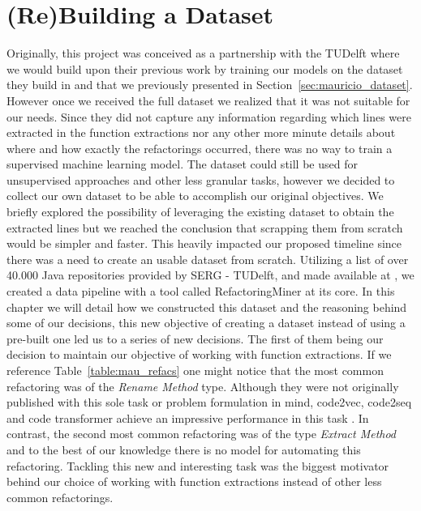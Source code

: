 



\chapter{(Re)Building a Dataset}
 Originally, this project was conceived as a partnership with the TUDelft where we would build upon their previous work by training our models on the dataset they build in \citet{mauricio_paper} and that we previously presented in Section~\ref{sec:mauricio_dataset}. However once we received the full dataset %
  we realized that it was not suitable for our needs. Since they did not capture any information regarding which lines were extracted in the function extractions nor any other more minute details about where and how  exactly the refactorings occurred, there was no way to train a supervised machine learning model. The dataset could still be used for unsupervised approaches and other less granular tasks, however we decided to collect our own dataset to be able to accomplish our original objectives. We briefly explored the possibility of leveraging the existing dataset to obtain the extracted lines but we reached the conclusion that scrapping them from scratch would be simpler and faster.
This heavily impacted our proposed timeline since there was a need to create an usable dataset from scratch. Utilizing a list of over 40.000 Java repositories %
provided by SERG - TUDelft, and made available at \citet{lista_repos},
we created a data pipeline with a tool called RefactoringMiner \citep{refactoringminer_2.0} at its core. 
In this chapter we will detail how we constructed this dataset and the reasoning behind some of our decisions, this new objective of creating a dataset instead of using a pre-built one led us to a series of new decisions. The first of them being our decision to maintain our objective of working with function extractions. 
If we reference Table~\ref{table:mau_refacs} one might notice that the most common refactoring was of the \textit{Rename Method} type. Although they were not originally published with this sole task or problem formulation in mind, code2vec, code2seq and code transformer achieve an impressive performance in this task \citep{code2vec, code2seq, code_transformer}.  In contrast, the second most common refactoring was of the type \textit{Extract Method} and to the best of our knowledge there is no model for automating this refactoring. Tackling this new and interesting task was the biggest motivator behind our choice of working with function extractions instead of other less common refactorings.

